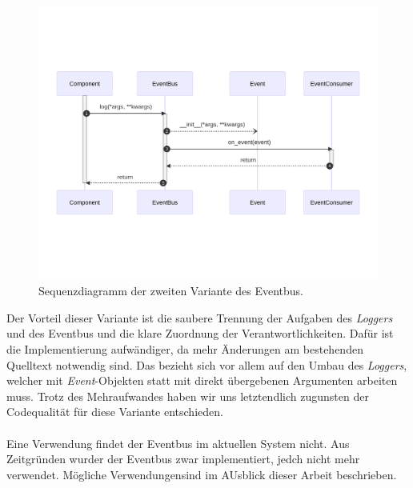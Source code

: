 \begin{figure}[htb]
	\centering
	\includegraphics[width=1.0\linewidth]{images/diagrams/eventbus-v2-seq.png}
	\caption{Sequenzdiagramm der zweiten Variante des Eventbus.}
	\label{fig:eventbus-v2-seq}
\end{figure}

Der Vorteil dieser Variante ist die saubere Trennung der Aufgaben des \emph{Loggers} und des Eventbus und die klare Zuordnung der Verantwortlichkeiten. Dafür ist die Implementierung aufwändiger, da mehr Änderungen am bestehenden Quelltext notwendig sind. Das bezieht sich vor allem auf den Umbau des \emph{Loggers}, welcher mit \emph{Event}-Objekten statt mit direkt übergebenen Argumenten arbeiten muss. Trotz des Mehraufwandes haben wir uns letztendlich zugunsten der Codequalität für diese Variante entschieden.\\
\\
Eine Verwendung findet der Eventbus im aktuellen System nicht. Aus Zeitgründen wurder der Eventbus zwar implementiert, jedch nicht mehr verwendet. Mögliche Verwendungensind im AUsblick dieser Arbeit beschrieben.